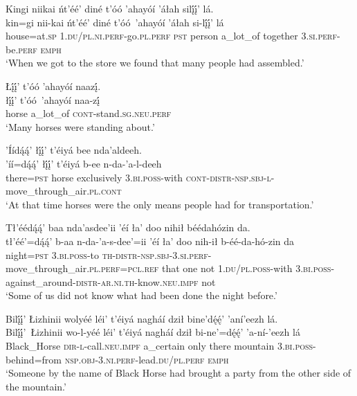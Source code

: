 \ea\label{ex:text1-28-1}
Kingi niikai ńt’éé’ diné t’óó ’ahayóí ’áłah silį́į́’ lá.\\
\gll kin=gi	nii-kai	ńt’éé’	diné	t’óó~{’ahayóí}	’áłah	si-lį́į́’	lá\\
     house=at.\textsc{sp}	1.\textsc{du}/\textsc{pl}.\textsc{ni}.\textsc{perf}-go.\textsc{pl}.\textsc{perf}	\textsc{pst}	person	a\_lot\_of	together	3.\textsc{si}.\textsc{perf}-be.\textsc{perf}	\textsc{emph}\\
\glt `When we got to the store we found that many people had assembled.'
\z

\ea\label{ex:text1-28-2}
Łį́į́’ t’óó ’ahayóí naazį́.\\
\gll łį́į́’	t’óó~{’ahayóí}	naa-zį́\\
     horse	a\_lot\_of	\textsc{cont}-stand.\textsc{sg}.\textsc{neu}.\textsc{perf}\\
\glt `Many horses were standing about.'
\z

\ea\label{ex:text1-28-3}
’Íídą́ą́’ łį́į́’ t’éiyá bee nda’aldeeh.\\
\gll ’íí=dą́ą́’	łį́į́’	t’éiyá	b-ee	n-da-’a-l-deeh\\
     there=\textsc{pst}	horse	exclusively	3.\textsc{bi}.\textsc{poss}-with	\textsc{cont}-\textsc{distr}-\textsc{nsp}.\textsc{sbj}-\textsc{l}-move\_through\_air.\textsc{pl}.\textsc{cont}\\
\glt `At that time horses were the only means people had for transportation.'
\z

\ea\label{ex:text1-28-4}
Tł’éédą́ą́’ baa nda’asdee’ii ’éí ła’ doo nihił béédahózin da.\\
\gll tł’éé’=dą́ą́’	b-aa	n-da-’a-s-dee’=ii	’éí	ła’	doo	nih-ił	b-éé-da-hó-zin	da\\
     night=\textsc{pst}	3.\textsc{bi}.\textsc{poss}-to	\textsc{th}-\textsc{distr}-\textsc{nsp}.\textsc{sbj}-3.\textsc{si}.\textsc{perf}-move\_through\_air.\textsc{pl}.\textsc{perf}=\textsc{pcl}.\textsc{ref}	that	one	not	1.\textsc{du}/\textsc{pl}.\textsc{poss}-with	3.\textsc{bi}.\textsc{poss}-against\_around-\textsc{distr}-\textsc{ar}.\textsc{ni}.\textsc{th}-know.\textsc{neu}.\textsc{impf}	not\\
\glt `Some of us did not know what had been done the night before.'
\z

\ea\label{ex:text1-28-5}
Bilį́į́’ Łizhinii wolyéé léi’ t’éiyá nagháí dził bine’dę́ę́’ ’aní’eezh lá.\\
\gll Bilį́į́’~{Łizhinii}	wo-l-yéé	léi’	t’éiyá	nagháí	dził	bi-ne’=dę́ę́’	’a-ní-’eezh	lá\\
     Black\_Horse	\textsc{dir}-\textsc{l}-call.\textsc{neu}.\textsc{impf}	a\_certain	only	there	mountain	3.\textsc{bi}.\textsc{poss}-behind=from	\textsc{nsp}.\textsc{obj}-3.\textsc{ni}.\textsc{perf}-lead.\textsc{du}/\textsc{pl}.\textsc{perf}	\textsc{emph}\\
\glt `Someone by the name of Black Horse had brought a party from the other side of the mountain.'
\z

